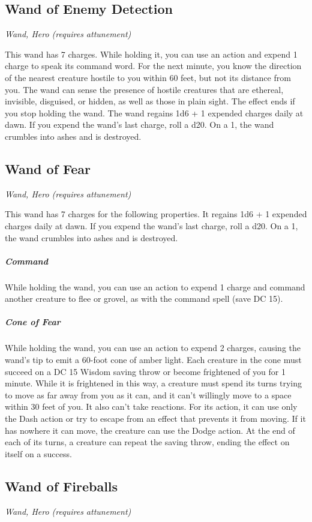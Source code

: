 \subsection{Wand of Enemy Detection}
\textit{Wand, Hero (requires attunement)}

This wand has 7 charges. While holding it, you can use an action and expend 1 charge to speak its command word. For the next minute, you know the direction of the nearest creature hostile to you within 60 feet,
but not its distance from you. The wand can sense the presence of hostile creatures that are ethereal, invisible, disguised, or hidden, as well as those in plain sight. The effect ends if you stop holding the wand.
The wand regains 1d6 + 1 expended charges daily at dawn. If you expend the wand's last charge, roll a d20. On a 1, the wand crumbles into ashes and is destroyed.

\subsection{Wand of Fear}
\textit{Wand, Hero (requires attunement)}

This wand has 7 charges for the following properties. It regains 1d6 + 1 expended charges daily at dawn. If you expend the wand's last charge, roll a d20. On a 1, the wand crumbles into ashes and is destroyed.

\subparagraph*{Command} While holding the wand, you can use an action to expend 1 charge and command another creature to flee or grovel, as with the command spell (save DC 15).

\subparagraph*{Cone of Fear} While holding the wand, you can use an action to expend 2 charges, causing the wand's tip to emit a 60-foot cone of amber light. Each creature in the cone must succeed on a DC 15 Wisdom saving throw or become frightened of you for 1 minute. While it is frightened in this way, a creature must spend its turns trying to move as far away from you as it can, and it can't willingly move to a space within 30 feet of you. It also can't take reactions. For its action, it can use only the Dash action or try to escape from an effect that prevents it from moving. If it has nowhere it can move, the creature can use the Dodge action. At the end of each of its turns, a creature can repeat the saving throw, ending the effect on itself on a success.

\subsection{Wand of Fireballs}
\textit{Wand, Hero (requires attunement)}

